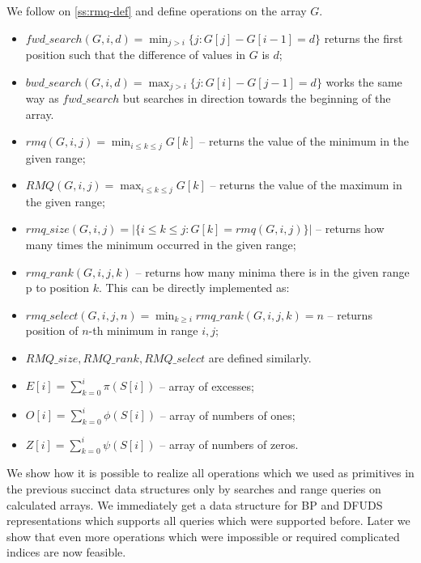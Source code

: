 We follow on \ref{ss:rmq-def} and define operations on the array $G$.
\begin{itemize}
	\item $fwd\_search(G, i, d) = \min_{j > i} \{j : G[j] - G[i - 1] = d\}$ returns the first position such that the difference of values in $G$ is $d$;
	\item $bwd\_search(G, i, d) = \max_{j > i} \{j : G[i] - G[j - 1] = d\}$ works the same way as $fwd\_search$ but searches in direction towards the beginning of the array.
	
	\item $rmq(G, i, j) = \min_{i \le k \le j} G[k]$ -- returns the value of the minimum in the given range;
	\item $RMQ(G, i, j) = \max_{i \le k \le j} G[k]$ -- returns the value of the maximum in the given range;

	\item $rmq\_size(G, i, j) = | \{ i \le k \le j : G[k] = rmq(G, i, j) \} | $ -- returns how many times the minimum occurred in the given range;
	\item $rmq\_rank(G, i, j, k)$ -- returns how many minima there is in the given range p to position $k$.
	This can be directly implemented as:
\begin{algorithmic}
			\State {}
		\Else
			\State {}
		\EndIf
	\EndFunction
\end{algorithmic}
	\item $rmq\_select(G, i, j, n) = \min_{k \ge i} rmq\_rank(G, i, j, k) = n$ -- returns position of $n$-th minimum in range $i, j$;
	\item $RMQ\_size, RMQ\_rank, RMQ\_select$ are defined similarly.
	
	\item $E[i] = \sum_{k=0}^i \pi(S[i])$ -- array of excesses;
	\item $O[i] = \sum_{k=0}^i \phi(S[i])$ -- array of numbers of ones;
	\item $Z[i] = \sum_{k=0}^i \psi(S[i])$ -- array of numbers of zeros.
\end{itemize}

We show how it is possible to realize all operations which we used as primitives in the previous succinct data structures only by searches and range queries on calculated arrays.
We immediately get a data structure for BP and DFUDS representations which supports all queries which were supported before.
Later we show that even more operations which were impossible or required complicated indices are now feasible.

